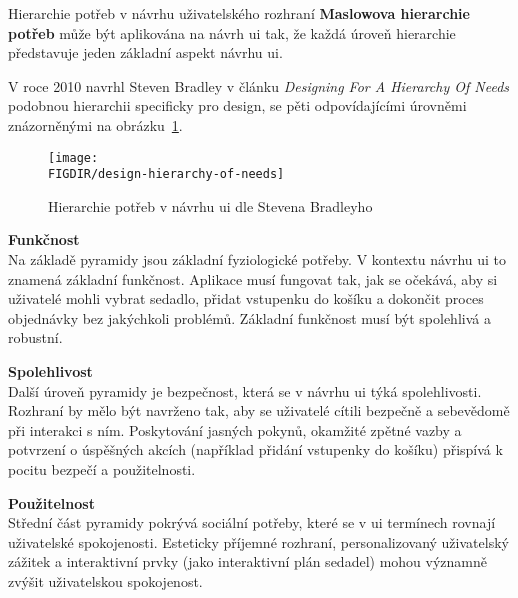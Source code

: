 \begin{subsection}{Hierarchie potřeb v návrhu uživatelského rozhraní}
    \label{subsec:navrh-uzivatelskeho-rozhrani-psychologie-hierarchie}
    \textbf{Maslowova hierarchie potřeb} může být aplikována na návrh \ac{ui} tak, že každá úroveň hierarchie představuje jeden základní aspekt návrhu \ac{ui}.

    V roce 2010 navrhl Steven Bradley v článku \textit{Designing For A Hierarchy Of Needs} podobnou hierarchii specificky pro design, se pěti odpovídajícími úrovněmi znázorněnými na obrázku~\ref{fig:design-hierarchy-of-needs}.\cite{bradley_hierarchy_of_needs}

    \begin{figure}[H]
        \centering
        \texttt{[image: \\FIGDIR/design-hierarchy-of-needs]}
        \caption{Hierarchie potřeb v návrhu \ac{ui} dle Stevena Bradleyho\cite{bradley_hierarchy_of_needs}}
        \label{fig:design-hierarchy-of-needs}
    \end{figure}

    \textbf{Funkčnost}\\
    Na základě pyramidy jsou základní fyziologické potřeby.
    V kontextu návrhu \ac{ui} to znamená základní funkčnost.
    Aplikace musí fungovat tak, jak se očekává, aby si uživatelé mohli vybrat sedadlo, přidat vstupenku do košíku a dokončit proces objednávky bez jakýchkoli problémů.
    Základní funkčnost musí být spolehlivá a robustní.

    \textbf{Spolehlivost}\\
    Další úroveň pyramidy je bezpečnost, která se v návrhu \ac{ui} týká spolehlivosti.
    Rozhraní by mělo být navrženo tak, aby se uživatelé cítili bezpečně a sebevědomě při interakci s ním.
    Poskytování jasných pokynů, okamžité zpětné vazby a potvrzení o úspěšných akcích (například přidání vstupenky do košíku) přispívá k pocitu bezpečí a použitelnosti.

    \textbf{Použitelnost}\\
    Střední část pyramidy pokrývá sociální potřeby, které se v \ac{ui} termínech rovnají uživatelské spokojenosti.
    Esteticky příjemné rozhraní, personalizovaný uživatelský zážitek a interaktivní prvky (jako interaktivní plán sedadel) mohou významně zvýšit uživatelskou spokojenost.


\end{subsection}
